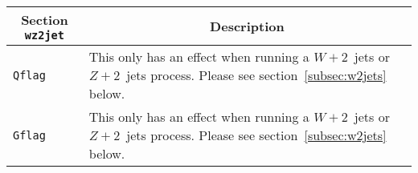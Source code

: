 	\begin{longtable}{p{1.5cm}p{12cm}}
		\toprule
		\multicolumn{1}{c}{{\textbf{Section} \texttt{wz2jet}}} & \multicolumn{1}{c}{{\textbf{Description}}} \\ 
		\midrule
		\texttt{Qflag} &
		This only has an effect when running a
		$W+2$~jets or $Z+2$~jets process. Please see section~\ref{subsec:w2jets}
		below. \\
		\texttt{Gflag} &
		This only has an effect when running a
		$W+2$~jets or $Z+2$~jets process. Please see section~\ref{subsec:w2jets}
		below. \\
		\bottomrule
	\end{longtable}
